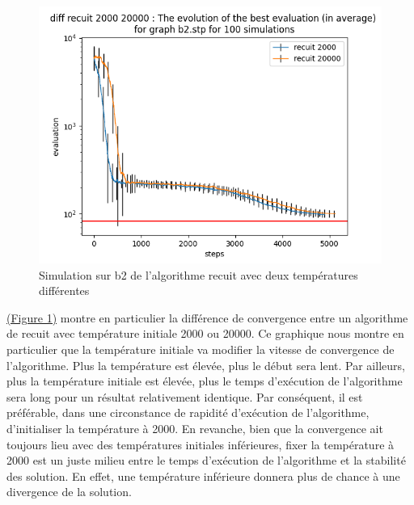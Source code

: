 \documentclass[11pt,french]{report}
\begin{document}
        \begin{figure}
        	\begin{center}
        		\includegraphics[width=1\textwidth]{best_b2_evaluation_diff recuit 2000 20000.png}
        	\end{center}
        	\caption{Simulation sur b2 de l'algorithme recuit avec deux températures différentes}
        	\label{Figure1}
        \end{figure}
        
        \hyperref[Figure1]{(Figure 1)} montre en particulier la différence de convergence entre un algorithme de recuit avec température initiale 2000 ou 20000. Ce graphique nous montre en particulier que la température initiale va modifier la vitesse de convergence de l'algorithme. Plus la température est élevée, plus le début sera lent. Par ailleurs, plus la température initiale est élevée, plus le temps d'exécution de l'algorithme sera long pour un résultat relativement identique.
        Par conséquent, il est préférable, dans une circonstance de rapidité d'exécution de l'algorithme, d'initialiser la température à 2000.
        En revanche, bien que la convergence ait toujours lieu avec des températures initiales inférieures, fixer la température à 2000 est un juste milieu entre le temps d'exécution de l'algorithme et la stabilité des solution. En effet, une température inférieure donnera plus de chance à une divergence de la solution.\\
        
\end{document}
